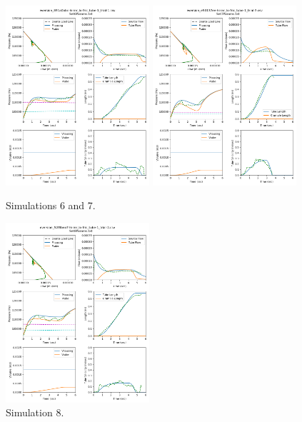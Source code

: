 \documentclass[letterpaper]{article}
\begin{document}
\begin{figure}\centering
\includegraphics[width=0.475\textwidth]{Set6result28-Jul.png}
\includegraphics[width=0.475\textwidth]{Set7result28-Jul.png}
\caption{Simulations 6 and 7.}
\end{figure}



\begin{figure}\centering
\includegraphics[width=0.475\textwidth]{Set8result28-Jul.png}
\caption{Simulation 8.}
\end{figure}



\end{document}
